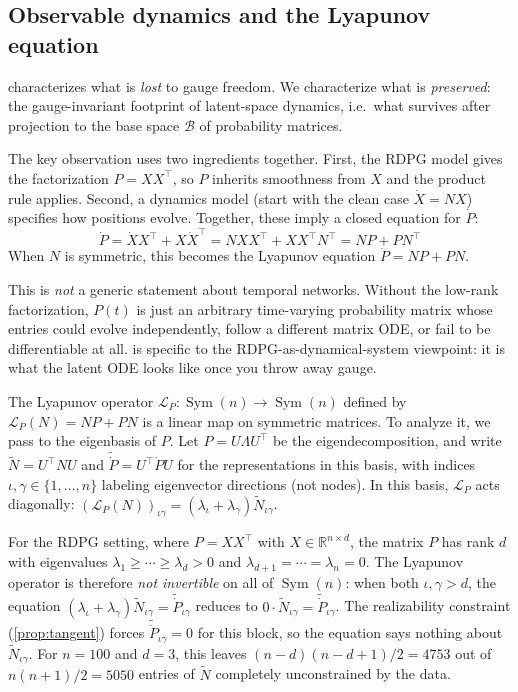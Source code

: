 \documentclass{article}
\newcommand{\RR}{\mathbb{R}}
\DeclareMathOperator{\Sym}{Sym}
\theoremstyle{plain}
\theoremstyle{definition}
\theoremstyle{remark}
\begin{document}
\subsection{Observable dynamics and the Lyapunov equation}\label{sec:p-dynamics}

 characterizes what is \emph{lost} to gauge freedom.
We characterize what is \emph{preserved}: the gauge-invariant footprint of latent-space dynamics, i.e.\ what survives after projection to the base space $\mathcal{B}$ of probability matrices.

The key observation uses two ingredients together.
First, the RDPG model gives the factorization $P = XX^\top$, so $P$ inherits smoothness from $X$ and the product rule applies.
Second, a dynamics model (start with the clean case $\dot{X} = NX$) specifies how positions evolve.
Together, these imply a closed equation for $\dot{P}$:
\begin{equation}\label{eq:p-dynamics}
\dot{P} = \dot{X} X^\top + X \dot{X}^\top = NXX^\top + XX^\top N^\top = NP + PN^\top
\end{equation}
When $N$ is symmetric, this becomes the Lyapunov equation $\dot{P} = NP + PN$.

This is \emph{not} a generic statement about temporal networks.
Without the low-rank factorization, $P(t)$ is just an arbitrary time-varying probability matrix whose entries could evolve independently, follow a different matrix ODE, or fail to be differentiable at all.
 is specific to the RDPG-as-dynamical-system viewpoint: it is what the latent ODE looks like once you throw away gauge.

The Lyapunov operator $\mathcal{L}_P: \Sym(n) \to \Sym(n)$ defined by $\mathcal{L}_P(N) = NP + PN$ is a linear map on symmetric matrices.
To analyze it, we pass to the eigenbasis of $P$.
Let $P = U \Lambda U^\top$ be the eigendecomposition, and write $\tilde{N} = U^\top N U$ and $\tilde{\dot{P}} = U^\top \dot{P} U$ for the representations in this basis, with indices $\iota, \gamma \in \{1, \ldots, n\}$ labeling eigenvector directions (not nodes).
In this basis, $\mathcal{L}_P$ acts diagonally: $(\mathcal{L}_P(N))_{\iota\gamma} = (\lambda_\iota + \lambda_\gamma) \tilde{N}_{\iota\gamma}$.

For the RDPG setting, where $P = XX^\top$ with $X \in \RR^{n \times d}$, the matrix $P$ has rank $d$ with eigenvalues $\lambda_1 \ge \cdots \ge \lambda_d > 0$ and $\lambda_{d+1} = \cdots = \lambda_n = 0$.
The Lyapunov operator is therefore \emph{not invertible} on all of $\Sym(n)$: when both $\iota, \gamma > d$, the equation $(\lambda_\iota + \lambda_\gamma) \tilde{N}_{\iota\gamma} = \tilde{\dot{P}}_{\iota\gamma}$ reduces to $0 \cdot \tilde{N}_{\iota\gamma} = \tilde{\dot{P}}_{\iota\gamma}$.
The realizability constraint (\cref{prop:tangent}) forces $\tilde{\dot{P}}_{\iota\gamma} = 0$ for this block, so the equation says nothing about $\tilde{N}_{\iota\gamma}$.
For $n = 100$ and $d = 3$, this leaves $(n - d)(n - d + 1)/2 = 4753$ out of $n(n+1)/2 = 5050$ entries of $\tilde{N}$ completely unconstrained by the data.
\end{document}
